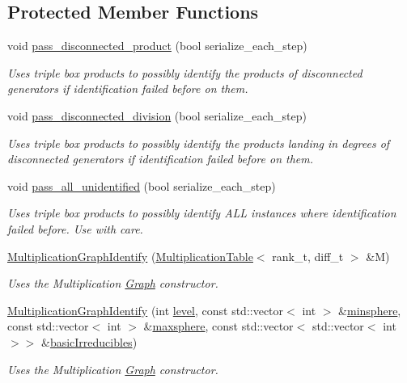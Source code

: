 \subsection*{Protected Member Functions}
\begin{DoxyCompactItemize}
\item 
void \hyperlink{classMackey_1_1MultiplicationGraphIdentify_a110991be3ba595dbf401ef4a769e4dec}{pass\+\_\+disconnected\+\_\+product} (bool serialize\+\_\+each\+\_\+step)
\begin{DoxyCompactList}\small\item\em Uses triple box products to possibly identify the products of disconnected generators if identification failed before on them. \end{DoxyCompactList}\item 
void \hyperlink{classMackey_1_1MultiplicationGraphIdentify_a9791070d75d845d15f1763c03db0b5ce}{pass\+\_\+disconnected\+\_\+division} (bool serialize\+\_\+each\+\_\+step)
\begin{DoxyCompactList}\small\item\em Uses triple box products to possibly identify the products landing in degrees of disconnected generators if identification failed before on them. \end{DoxyCompactList}\item 
void \hyperlink{classMackey_1_1MultiplicationGraphIdentify_ab0b4e28dd9134d591305dde1c02b3da5}{pass\+\_\+all\+\_\+unidentified} (bool serialize\+\_\+each\+\_\+step)
\begin{DoxyCompactList}\small\item\em Uses triple box products to possibly identify A\+LL instances where identification failed before. Use with care. \end{DoxyCompactList}\item 
\hyperlink{classMackey_1_1MultiplicationGraphIdentify_a14b3d3ea4be57324231fd206354fa627}{Multiplication\+Graph\+Identify} (\hyperlink{classMackey_1_1MultiplicationTable}{Multiplication\+Table}$<$ rank\+\_\+t, diff\+\_\+t $>$ \&M)
\begin{DoxyCompactList}\small\item\em Uses the Multiplication \hyperlink{classMackey_1_1Graph}{Graph} constructor. \end{DoxyCompactList}\item 
\hyperlink{classMackey_1_1MultiplicationGraphIdentify_afeeb10a0f941f3a9f7bad8da4368a677}{Multiplication\+Graph\+Identify} (int \hyperlink{classMackey_1_1MultiplicationTable_ad5a05c126e0b3c769fa9b1196a8db96a}{level}, const std\+::vector$<$ int $>$ \&\hyperlink{classMackey_1_1MultiplicationTable_a071f7d7c6cd1c75836b64ea8e9923b49}{minsphere}, const std\+::vector$<$ int $>$ \&\hyperlink{classMackey_1_1MultiplicationTable_a4355003c6be4a4f857eba151c8e5bcf6}{maxsphere}, const std\+::vector$<$ std\+::vector$<$ int $>$$>$ \&\hyperlink{classMackey_1_1MultiplicationTable_af6896ea01c087e71533de423d7cf65ac}{basic\+Irreducibles})
\begin{DoxyCompactList}\small\item\em Uses the Multiplication \hyperlink{classMackey_1_1Graph}{Graph} constructor. \end{DoxyCompactList}\end{DoxyCompactItemize}
